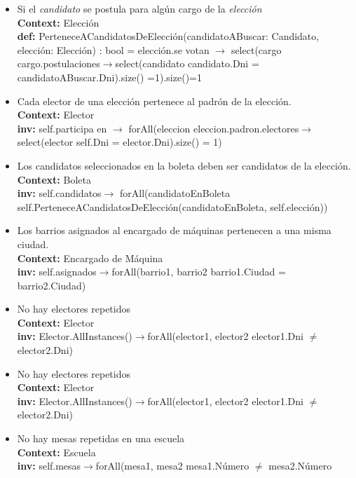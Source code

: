 \documentclass[spanish, 10pt,a4paper]{article}
\numberwithin{equation}{section} %
\begin{document}
\begin{itemize}
	\item Si el \textit{candidato} se postula para algún cargo de la \textit{elección}
\\	\textbf{Context: }  Elección
\\	\textbf{def: }PerteneceACandidatosDeElección(candidatoABuscar: Candidato, elección: Elección) : bool = elección.se votan $\rightarrow$ select(cargo \textbar cargo.postulaciones$\rightarrow$select(candidato \textbar candidato.Dni = candidatoABuscar.Dni).size() =1).size()=1

	\item Cada elector de una elección pertenece al padrón de la elección.
\\	\textbf{Context: }  Elector
\\	\textbf{inv: }self.participa en $\rightarrow$ forAll(eleccion \textbar eleccion.padron.electores$\rightarrow$select(elector \textbar self.Dni = elector.Dni).size() = 1)

	\item Los candidatos seleccionados en la boleta deben ser candidatos de la elección.
\\	\textbf{Context: }  Boleta
\\	\textbf{inv: }self.candidatos$\rightarrow$ forAll(candidatoEnBoleta \textbar self.PerteneceACandidatosDeElección(candidatoEnBoleta, self.elección))

	\item Los barrios asignados al encargado de máquinas pertenecen a una misma ciudad.
\\	\textbf{Context: }  Encargado de Máquina
\\	\textbf{inv: } self.asignados$\rightarrow$forAll(barrio1, barrio2 \textbar barrio1.Ciudad = barrio2.Ciudad)

	\item No hay electores repetidos
\\	\textbf{Context: }  Elector
\\	\textbf{inv: } Elector.AllInstances()$\rightarrow$forAll(elector1, elector2 \textbar elector1.Dni $\neq$ elector2.Dni)

	\item No hay electores repetidos
\\	\textbf{Context: }  Elector
\\	\textbf{inv: } Elector.AllInstances()$\rightarrow$forAll(elector1, elector2 \textbar elector1.Dni $\neq$ elector2.Dni)

	\item No hay mesas repetidas en una escuela
\\	\textbf{Context: }  Escuela
\\	\textbf{inv: } self.mesas$\rightarrow$forAll(mesa1, mesa2 \textbar mesa1.Número $\neq$ mesa2.Número


\end{itemize}
\end{document}
